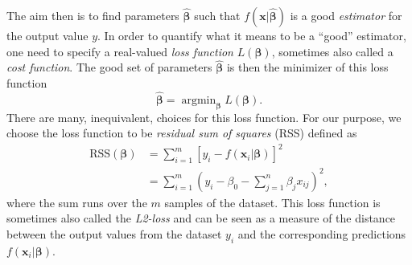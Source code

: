 The aim then is to find parameters $\hat{\bm{\beta}}$ such that $f(\bm{x}|\hat{\bm{\beta}})$ is a good \emph{estimator} for the output value $y$. In order to quantify what it means to be a ``good'' estimator, one need to specify a real-valued \emph{loss function} $L(\bm{\beta})$, sometimes also called a \emph{cost function}. The good set of parameters $\hat{\bm{\beta}}$ is then the  minimizer of this loss function
\begin{equation}
    \hat{\bm{\beta}} = \mathop{\mathrm{argmin}}_{\bm{\beta}} L(\bm{\beta}).
\end{equation}
There are many, inequivalent, choices for this loss function. For our purpose, we choose the loss function to be \textit{residual sum of squares} (RSS) defined as
\begin{equation}\label{eqn: RSS}
\begin{split}
    \textrm{RSS}(\bm{\beta}) &= \sum_{i=1}^{m} [y_{i} -  f(\bm{x}_{i}|\bm{\beta})]^{2} \\
    &= \sum_{i=1}^{m} \left(y_{i} -  \beta_0 -\sum_{j=1}^{n} \beta_{j}x_{ij}\right)^{2},
\end{split}
\end{equation}
where the sum runs over the $m$ samples of the dataset. This loss function is sometimes also called the \emph{L2-loss} and can be seen as a measure of the distance between the output values from the dataset $y_i$ and the corresponding predictions $f(\bm{x}_i|\bm{\beta})$.

